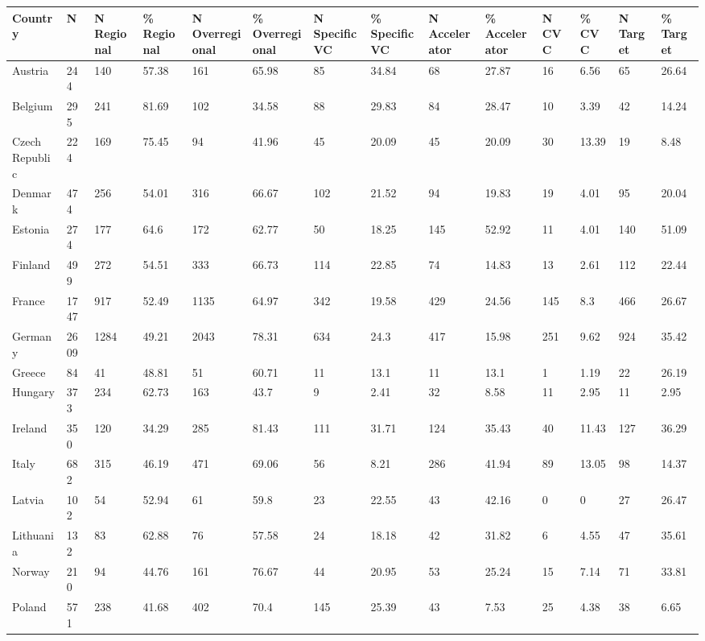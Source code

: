 \begin{tabular}{llllllllllllll}
  \toprule
Country & N & N Regional & \% Regional & N Overregional & \% Overregional & N Specific VC & \% Specific VC & N Accelerator & \% Accelerator & N CVC & \% CVC & N Target & \% Target \\ 
  \midrule
Austria & 244 & 140 & 57.38 & 161 & 65.98 & 85 & 34.84 & 68 & 27.87 & 16 & 6.56 & 65 & 26.64 \\ 
  Belgium & 295 & 241 & 81.69 & 102 & 34.58 & 88 & 29.83 & 84 & 28.47 & 10 & 3.39 & 42 & 14.24 \\ 
  Czech Republic & 224 & 169 & 75.45 & 94 & 41.96 & 45 & 20.09 & 45 & 20.09 & 30 & 13.39 & 19 & 8.48 \\ 
  Denmark & 474 & 256 & 54.01 & 316 & 66.67 & 102 & 21.52 & 94 & 19.83 & 19 & 4.01 & 95 & 20.04 \\ 
  Estonia & 274 & 177 & 64.6 & 172 & 62.77 & 50 & 18.25 & 145 & 52.92 & 11 & 4.01 & 140 & 51.09 \\ 
  Finland & 499 & 272 & 54.51 & 333 & 66.73 & 114 & 22.85 & 74 & 14.83 & 13 & 2.61 & 112 & 22.44 \\ 
  France & 1747 & 917 & 52.49 & 1135 & 64.97 & 342 & 19.58 & 429 & 24.56 & 145 & 8.3 & 466 & 26.67 \\ 
  Germany & 2609 & 1284 & 49.21 & 2043 & 78.31 & 634 & 24.3 & 417 & 15.98 & 251 & 9.62 & 924 & 35.42 \\ 
  Greece & 84 & 41 & 48.81 & 51 & 60.71 & 11 & 13.1 & 11 & 13.1 & 1 & 1.19 & 22 & 26.19 \\ 
  Hungary & 373 & 234 & 62.73 & 163 & 43.7 & 9 & 2.41 & 32 & 8.58 & 11 & 2.95 & 11 & 2.95 \\ 
  Ireland & 350 & 120 & 34.29 & 285 & 81.43 & 111 & 31.71 & 124 & 35.43 & 40 & 11.43 & 127 & 36.29 \\ 
  Italy & 682 & 315 & 46.19 & 471 & 69.06 & 56 & 8.21 & 286 & 41.94 & 89 & 13.05 & 98 & 14.37 \\ 
  Latvia & 102 & 54 & 52.94 & 61 & 59.8 & 23 & 22.55 & 43 & 42.16 & 0 & 0 & 27 & 26.47 \\ 
  Lithuania & 132 & 83 & 62.88 & 76 & 57.58 & 24 & 18.18 & 42 & 31.82 & 6 & 4.55 & 47 & 35.61 \\ 
  Norway & 210 & 94 & 44.76 & 161 & 76.67 & 44 & 20.95 & 53 & 25.24 & 15 & 7.14 & 71 & 33.81 \\ 
  Poland & 571 & 238 & 41.68 & 402 & 70.4 & 145 & 25.39 & 43 & 7.53 & 25 & 4.38 & 38 & 6.65 \\ 

\end{tabular}
